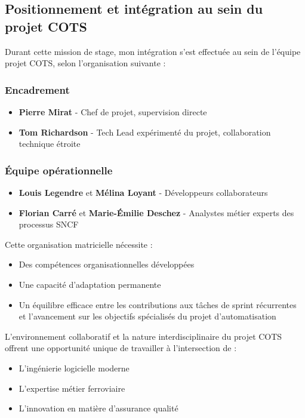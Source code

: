 \subsection{Positionnement et intégration au sein du projet COTS}

Durant cette mission de stage, mon intégration s'est effectuée au sein de l'équipe projet COTS, selon l'organisation suivante :

\subsubsection{Encadrement}
\begin{itemize}
    \item \textbf{Pierre Mirat} - Chef de projet, supervision directe
    \item \textbf{Tom Richardson} - Tech Lead expérimenté du projet, collaboration technique étroite
\end{itemize}

\subsubsection{Équipe opérationnelle}
\begin{itemize}
    \item \textbf{Louis Legendre} et \textbf{Mélina Loyant} - Développeurs collaborateurs
    \item \textbf{Florian Carré} et \textbf{Marie-Émilie Deschez} - Analystes métier experts des processus SNCF
\end{itemize}

Cette organisation matricielle nécessite :
\begin{itemize}
    \item Des compétences organisationnelles développées
    \item Une capacité d'adaptation permanente
    \item Un équilibre efficace entre les contributions aux tâches de sprint récurrentes et l'avancement sur les objectifs spécialisés du projet d'automatisation
\end{itemize}

L'environnement collaboratif et la nature interdisciplinaire du projet COTS offrent une opportunité unique de travailler à l'intersection de :
\begin{itemize}
    \item L'ingénierie logicielle moderne
    \item L'expertise métier ferroviaire
    \item L'innovation en matière d'assurance qualité
\end{itemize}

